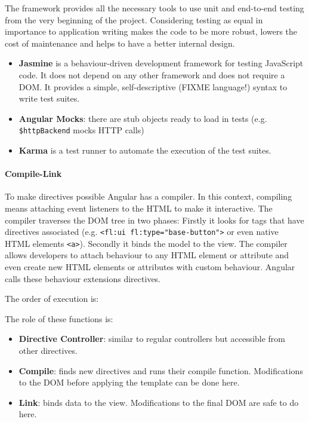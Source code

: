 The framework provides all the necessary tools to use unit and end-to-end testing from the very beginning of the project.
Considering testing as equal in importance to application writing makes the code to be more robust, lowers the cost of maintenance and helps to have a better internal design.
\begin{itemize}
    \item \textbf{Jasmine} is a behaviour-driven development framework for testing JavaScript code. It does not depend on any other framework and does not require a \ac{DOM}. It provides a simple, self-descriptive (FIXME language!) syntax to write test suites.
    \item \textbf{Angular Mocks}: there are stub objects ready to load in tests (e.g. \texttt{\$httpBackend} mocks \ac{HTTP} calls)
    \item \textbf{Karma} is a test runner to automate the execution of the test suites. 
\end{itemize}
    
\paragraph{Compile-Link} To make directives possible Angular has a compiler.
In this context, compiling means attaching event listeners to the \ac{HTML} to make it interactive.
The compiler traverses the \ac{DOM} tree in two phases:
Firstly it looks for tags that have directives associated (e.g. \lstinline$<fl:ui fl:type="base-button">$ or even native \ac{HTML} elements \lstinline$<a>$).
Secondly it binds the model to the view.
The compiler allows developers to attach behaviour to any \ac{HTML} element or attribute and even create new HTML elements or attributes with custom behaviour.
Angular calls these behaviour extensions directives.

The order of execution is:





The role of these functions is:
\begin{itemize}
\item \textbf{Directive Controller}: similar to regular controllers but accessible from other directives. 
\item \textbf{Compile}: finds new directives and runs their compile function. Modifications to the \ac{DOM} before applying the template can be done here.
\item \textbf{Link}: binds data to the view. Modifications to the final \ac{DOM} are safe to do here.
\end{itemize}

